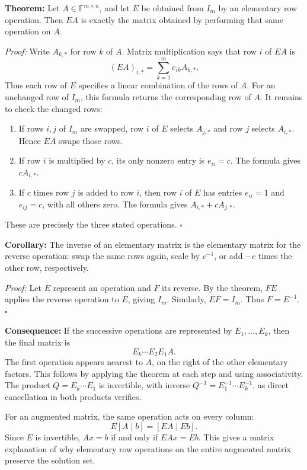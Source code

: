 \documentclass[a4paper,11pt,abstract=true]{scrartcl}
\theoremstyle{dotlessP}
\theoremstyle{dotlessS}
\theoremstyle{remark}
\theoremstyle{definition}
\begin{document}
\begin{problem_box}
\textbf{Theorem:}
Let $A\in\mathbb{F}^{m\times n}$, and let $E$ be obtained from $I_m$
by an elementary row operation. Then $EA$ is exactly the matrix
obtained by performing that same operation on $A$.

\end{problem_box}

\begin{claim_box}
\textit{Proof:} Write $A_{k,*}$ for row $k$ of $A$. Matrix
multiplication says that row $i$ of $EA$ is
\[
{(EA)}_{i,*}=\sum_{k=1}^m e_{ik}A_{k,*}.
\]
Thus each row of $E$ specifies a linear combination of the rows of $A$.
For an unchanged row of $I_m$, this formula returns the corresponding
row of $A$. It remains to check the changed rows:
\begin{enumerate}
    \item If rows $i,j$ of $I_m$ are swapped, row $i$ of $E$ selects
    $A_{j,*}$ and row $j$ selects $A_{i,*}$. Hence $EA$ swaps those rows.
    \item If row $i$ is multiplied by $c$, its only nonzero entry
    is $e_{ii}=c$. The formula gives $cA_{i,*}$.
    \item If $c$ times row $j$ is added to row $i$, then row $i$
    of $E$ has entries $e_{ii}=1$ and $e_{ij}=c$, with all others
    zero. The formula gives $A_{i,*}+cA_{j,*}$.
\end{enumerate}
These are precisely the three stated operations. \hfill$\square$
\end{claim_box}

\begin{problem_box}
\textbf{Corollary:}
The inverse of an elementary matrix is the elementary matrix for the
reverse operation: swap the same rows again, scale by $c^{-1}$,
or add $-c$ times the other row, respectively.

\end{problem_box}

\begin{claim_box}
\textit{Proof:} Let $E$ represent an operation and $F$ its reverse.
By the theorem, $FE$ applies the reverse operation to $E$, giving
$I_m$. Similarly, $EF=I_m$. Thus $F=E^{-1}$. \hfill$\square$
\end{claim_box}

\begin{claim_box}
\textbf{Consequence:} If the
successive operations are represented by $E_1,\ldots,E_k$, then the
final matrix is
\[
E_k\cdots E_2E_1A.
\]
The first operation appears nearest to $A$, on the right of the other
elementary factors. This follows by applying the theorem at each step
and using associativity. The product $Q=E_k\cdots E_1$ is invertible,
with inverse $Q^{-1}=E_1^{-1}\cdots E_k^{-1}$, as direct cancellation
in both products verifies.

For an augmented matrix, the same operation acts on every column:
\[
E[A\mid b]=[EA\mid Eb].
\]
Since $E$ is invertible, $Ax=b$ if and only if $EAx=Eb$.
This gives a matrix explanation of why elementary row operations on
the entire augmented matrix preserve the solution set.
\end{claim_box}
\end{document}

